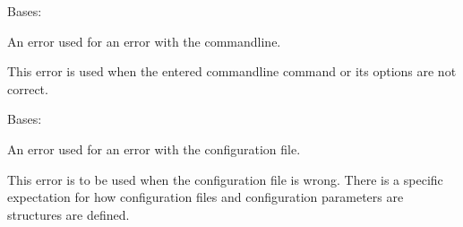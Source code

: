 \documentclass[letterpaper,11pt,english]{sphinxmanual}
\begin{document}
\begin{savenotes}\begin{fulllineitems}
\label{\detokenize{code/lezargus.library.logging:lezargus.library.logging.CommandLineError}}
\pysigstartsignatures
{}
\pysigstopsignatures
\sphinxAtStartPar
Bases: {\hyperref[\detokenize{code/lezargus.library.logging:lezargus.library.logging.LezargusError}]{}}

\sphinxAtStartPar
An error used for an error with the command\sphinxhyphen{}line.

\sphinxAtStartPar
This error is used when the entered command\sphinxhyphen{}line command or its options
are not correct.

\end{fulllineitems}\end{savenotes}


\begin{savenotes}\begin{fulllineitems}
\label{\detokenize{code/lezargus.library.logging:lezargus.library.logging.ConfigurationError}}
\pysigstartsignatures
{}
\pysigstopsignatures
\sphinxAtStartPar
Bases: {\hyperref[\detokenize{code/lezargus.library.logging:lezargus.library.logging.LezargusError}]{}}

\sphinxAtStartPar
An error used for an error with the configuration file.

\sphinxAtStartPar
This error is to be used when the configuration file is wrong. There is a
specific expectation for how configuration files and configuration
parameters are structures are defined.

\end{fulllineitems}\end{savenotes}

\end{document}
